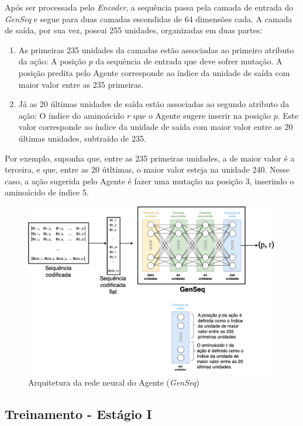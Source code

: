 Após ser processada pelo \textit{Encoder}, a sequência passa pela camada de entrada do \textit{GenSeq} e 
segue para duas camadas escondidas de 64 dimensões cada. 
A camada de saída, por sua vez, possui 255 unidades, organizadas em duas partes:

\begin{enumerate}
  \item As primeiras 235 unidades da camadas estão associadas ao primeiro atributo da ação: A posição $p$ da sequência de entrada
  que deve sofrer mutação. A posição predita pelo Agente corresponde ao índice da unidade de saída com maior valor entre as 235 primeiras. 
  \item Já as 20 últimas unidades de saída estão associadas ao segundo atributo da ação: O índice do aminoácido $r$ que o Agente sugere inserir na posição $p$.
  Este valor corresponde ao índice da unidade de saída com maior valor entre as 20 últimas unidades, subtraído de 235.
\end{enumerate}

Por exemplo, suponha que, entre as 235 primeiras unidades, a de maior valor é a terceira, e que, entre as 20 útltimas, o maior valor esteja na unidade 240. 
Nesse caso, a ação sugerida pelo Agente é fazer uma mutação na posição 3, inserindo o aminoácido de índice 5.

\begin{figure}[H]
  \centering
  \includegraphics[width=.8\textwidth]{figuras/metodologia-NN_arch_actor.jpg}
  \caption{Arquitetura da rede neural do Agente (\textit{GenSeq})}
  \label{fig:actor_arch}
\end{figure}


\subsection{Treinamento - Estágio I}
\label{subsection:stage1}

